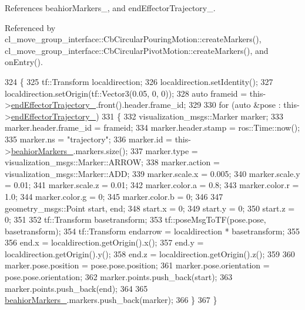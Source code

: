 References beahior\+Markers\+\_\+, and end\+Effector\+Trajectory\+\_\+.



Referenced by cl\+\_\+move\+\_\+group\+\_\+interface\+::\+Cb\+Circular\+Pouring\+Motion\+::create\+Markers(), cl\+\_\+move\+\_\+group\+\_\+interface\+::\+Cb\+Circular\+Pivot\+Motion\+::create\+Markers(), and on\+Entry().


\begin{DoxyCode}
324     \{
325         tf::Transform localdirection;
326         localdirection.setIdentity();
327         localdirection.setOrigin(tf::Vector3(0.05, 0, 0));
328         \textcolor{keyword}{auto} frameid = this->\hyperlink{classcl__move__group__interface_1_1CbMoveEndEffectorTrajectory_ae13dfd31ea3660646e03882f0c2c29f0}{endEffectorTrajectory\_}.front().header.frame\_id;
329 
330         \textcolor{keywordflow}{for} (\textcolor{keyword}{auto} &pose : this->\hyperlink{classcl__move__group__interface_1_1CbMoveEndEffectorTrajectory_ae13dfd31ea3660646e03882f0c2c29f0}{endEffectorTrajectory\_})
331         \{
332             visualization\_msgs::Marker marker;
333             marker.header.frame\_id = frameid;
334             marker.header.stamp = ros::Time::now();
335             marker.ns = \textcolor{stringliteral}{"trajectory"};
336             marker.id = this->\hyperlink{classcl__move__group__interface_1_1CbMoveEndEffectorTrajectory_a809fb5385adf27c0a1c8f8136566949c}{beahiorMarkers\_}.markers.size();
337             marker.type = visualization\_msgs::Marker::ARROW;
338             marker.action = visualization\_msgs::Marker::ADD;
339             marker.scale.x = 0.005;
340             marker.scale.y = 0.01;
341             marker.scale.z = 0.01;
342             marker.color.a = 0.8;
343             marker.color.r = 1.0;
344             marker.color.g = 0;
345             marker.color.b = 0;
346 
347             geometry\_msgs::Point start, end;
348             start.x = 0;
349             start.y = 0;
350             start.z = 0;
351 
352             tf::Transform basetransform;
353             tf::poseMsgToTF(pose.pose, basetransform);
354             tf::Transform endarrow = localdirection * basetransform;
355 
356             end.x = localdirection.getOrigin().x();
357             end.y = localdirection.getOrigin().y();
358             end.z = localdirection.getOrigin().z();
359 
360             marker.pose.position = pose.pose.position;
361             marker.pose.orientation = pose.pose.orientation;
362             marker.points.push\_back(start);
363             marker.points.push\_back(end);
364 
365             \hyperlink{classcl__move__group__interface_1_1CbMoveEndEffectorTrajectory_a809fb5385adf27c0a1c8f8136566949c}{beahiorMarkers\_}.markers.push\_back(marker);
366         \}
367     \}
\end{DoxyCode}
